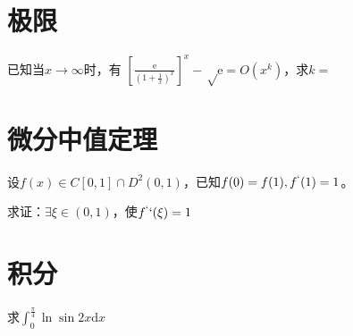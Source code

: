 \documentclass{ctexbook}
\begin{document}
	\section*{极限}
	已知当$x\rightarrow \infty$时，有
	$[\frac{\mathrm{e}}{(1+\frac{1}{x})^x}]^x-\sqrt\mathrm{e}=O(x^k)$，求$k=$
	
	\section*{微分中值定理}
	设$f(x) \in C[0,1] \cap D^2 (0,1)$，已知$f(0)=f(1),f^`(1)=1$。
	
	求证：$\exists \xi \in (0,1)$，使$f^``(\xi)=1$
	
	\section*{积分}
	求$\displaystyle\int_0^\frac{\pi}{4} \ln \sin2x \mathrm{d}x$
\end{document}
